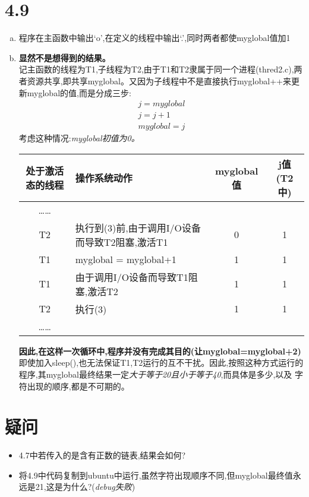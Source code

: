 \documentclass[UTF8]{ctexart}
\begin{document}
    \section*{4.9}
    \begin{enumerate}[a.]
        \item 程序在主函数中输出‘o’,在定义的线程中输出‘.’,同时两者都使myglobal值加1
        \item 
             \textbf{显然不是想得到的结果。}\\
             记主函数的线程为T1,子线程为T2,由于T1和T2隶属于同一个进程(thred2.c),两者资源共享,即共享myglobal。又因为子线程中不是直接执行myglobal++来更新myglobal的值,而是分成三步: \\
             \begin{gather}
                 j = myglobal\\
                 j = j+1\\
                 myglobal = j
             \end{gather}
             考虑这种情况:\emph{myglobal初值为0。}\par 
             \begin{table}[h]
                 \centering
                 
                 \begin{tabular}{cp{6cm}cc}
                 \hline
                 处于激活态的线程&操作系统动作&myglobal值&j值(T2中)\\
                 \hline
                 ……\\
                 T2&执行到(3)前,由于调用I/O设备而导致T2阻塞,激活T1&0&1\\
                 T1&myglobal = myglobal+1&1&1\\
                 T1&由于调用I/O设备而导致T1阻塞,激活T2&1&1\\
                 T2&执行(3)&1&1\\
                 ……\\
                 \hline        
                 \end{tabular}
             \end{table}
             \textbf{因此,在这样一次循环中,程序并没有完成其目的(让myglobal=myglobal+2)}\\
             即使加入sleep(),也无法保证T1,T2运行的互不干扰。因此,按照这种方式运行的程序,其myglobal最终结果一定\emph{大于等于20且小于等于40},而具体是多少,以及
             字符出现的顺序,都是不可期的。
    \end{enumerate}
    \section*{疑问}
    \begin{itemize}
        \item 4.7中若传入的是含有正数的链表,结果会如何?
        \item 将4.9中代码复制到ubuntu中运行,虽然字符出现顺序不同,但myglobal最终值永远是21,这是为什么?(\emph{debug失败})
    \end{itemize}
\end{document}
